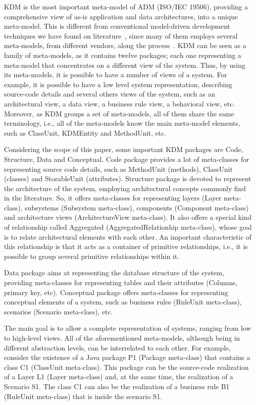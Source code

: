 KDM is the most important meta-model of ADM (ISO/IEC 19506), providing a comprehensive view of as-is application and data architectures, into a unique meta-model. This is different from conventional model-driven development techniques we have found on literature~\cite{7051941}, since many of them employs several meta-models, from different vendors, along the process~\cite{Perez-Castillo:2011:KDM}. KDM can be seen as a family of meta-models, as it contains twelve packages; each one representing a meta-model that concentrates on a different view of the system. Thus, by using its  meta-models, it is possible to have a number of views of a system. For example, it is possible to have a low level system representation, describing source-code details and several others views of the system, such as an architectural view, a data view, a business rule view, a behavioral view, etc. Moreover, as KDM groups a set of meta-models, all of them share the same terminology, i.e., all of the meta-models know the main meta-model elements, such as ClassUnit, KDMEntity and MethodUnit, etc.

Considering the scope of this paper, some important KDM packages are Code, Structure, Data and Conceptual. Code package provides a lot of meta-classes for representing source code details, such as MethodUnit (methods), ClassUnit (classes) and StorableUnit (attributes). Structure package is devoted to represent the architecture of the system, employing architectural concepts commonly find in the literature. So, it offers meta-classes for representing layers (Layer meta-class), subsystems (Subsystem meta-class), components (Component meta-class) and architecture views (ArchitectureView meta-class). It also offers a special kind of relationship called Aggregated (AggregatedRelationhip meta-class), whose goal is to relate architectural elements with each other. An important characteristic of this relationship is that it acts as a container of primitive relationships, i.e., it is possible to group several primitive relationships within it. 

Data package aims at representing the database structure of the system, providing meta-classes for representing tables and their attributes (Columns, primary key, etc). Conceptual package offers meta-classes for representing conceptual elements of a system, such as business rules (RuleUnit meta-class), scenarios (Scenario meta-class), etc. 

The main goal is to allow a complete representation of systems, ranging from low to high-level views. All of the aforementioned meta-models, although being in different abstraction levels, can be interrelated to each other. For example, consider the existence of a Java package P1 (Package meta-class) that contains a class C1 (ClassUnit meta-class). This package can be the source-code realization of a Layer L1 (Layer meta-class) and, at the same time, the realization of a Scenario S1. The class C1 can also be the realization of a business rule B1 (RuleUnit meta-class) that is inside the scenario S1. 

